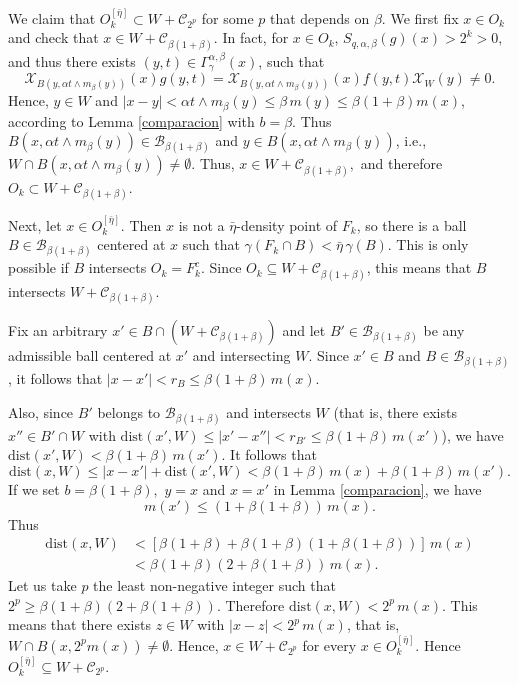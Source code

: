 \documentclass[leqno,11pt]{amsart}
\theoremstyle{plain}
\theoremstyle{remark}
\begin{document}
{{{{We claim that $O_k^{[\bar{\eta}]} 
\subset W+\mathscr{C}_{2^p}$ for some $p$ that depends on $\beta.$}
We first fix $x\in O_k$ and check that $x\in W+\mathscr{C}_{\beta (1+\beta)}$. In fact, for $x\in O_k$, $S_{q,\alpha, \beta} (g)(x)>2^k>0,$ and thus there exists $(y,t)\in \Gamma_\gamma^{\alpha, \beta}(x)$, such that
\[\mathcal{X}_{B(y,\alpha t\wedge m_\beta(y))}(x) g(y,t)=\mathcal{X}_{B(y,\alpha t\wedge m_\beta(y))}(x) f(y,t) \mathcal{X}_{W}(y)\neq 0.\]
Hence, $y\in W$ and $|x-y|<\alpha t\wedge m_\beta(y) \leq\beta\,  m(y)\leq \beta (1+\beta) m(x)$, according to Lemma \ref{comparacion} with $b=\beta.$ Thus $B(x,\alpha t\wedge m_\beta(y))\in \mathscr{B}_{\beta (1+\beta)}$ and $y\in B(x,\alpha t\wedge m_\beta(y))$, i.e., $W\cap B(x,\alpha t\wedge m_\beta(y))\neq \emptyset$. Thus, $x\in W+\mathscr{C}_{\beta (1+\beta)},$  and therefore $O_k\subset   W+\mathscr{C}_{\beta (1+\beta)}$.

Next, let $x\in O_k^{[\bar{\eta}]}$. Then $x$ is not a $\bar{\eta}$-density point of $F_k$, so there is a ball $B\in \mathscr{B}_{\beta(1+\beta)}$ centered at $x$ such that $\gamma(F_k\cap B)<\bar{\eta}\,  \gamma(B)$. This is only possible if $B$ intersects $O_k=F_k^c$. Since $O_k\subseteq W+\mathscr{C}_{\beta(1+\beta)}$, this means that $B$ intersects $W+\mathscr{C}_{\beta (1+\beta)}$.

Fix an arbitrary $x'\in B\cap (W+\mathscr{C}_{\beta(1+\beta)})$ and let $B'\in \mathscr{B}_{\beta(1+\beta)}$ be any admissible ball centered at $x'$ and intersecting $W$. Since $x'\in B$ and $B\in \mathscr{B}_{\beta(1+\beta)}$, it follows that $|x-x'|<r_B\le \beta (1+\beta)\, m(x).$ 

Also, since $B'$ belongs to $\mathscr{B}_{\beta (1+\beta)}$ and intersects $W$ (that is, there exists $x''\in B'\cap W$ with $\text{dist}(x',W)\leq |x'-x''|<r_{B'}\leq \beta (1+\beta)\, m(x')$), we have $\text{dist}(x',W)<\beta (1+\beta)\, m(x')$. It follows that 
\[\text{dist}(x,W)\leq |x-x'|+\text{dist}(x',W)<\beta(1+\beta)\, m(x)+\beta (1+\beta)\, m(x').\]
If we set $b=\beta(1+\beta),$ $y=x$ and $x=x'$ in Lemma \ref{comparacion}, we have $$m(x')\le (1+\beta (1+\beta))\, m(x).$$ Thus
\begin{align*}\text{dist}(x,W)&<[\beta(1+\beta)+\beta (1+\beta)(1+\beta (1+\beta))]\, m(x)\\ &<\beta (1+\beta) (2+\beta(1+\beta))\, m(x).
\end{align*}
Let us take $p$ the least non-negative integer such that $2^p\ge \beta (1+\beta)(2+\beta(1+\beta)).$ Therefore $\text{dist}(x,W)<2^p\, m(x).$
This means that there exists $z\in W$ with $|x-z|<2^p\, m(x)$, that is, $W\cap B(x,2^p m(x))\neq \emptyset$. Hence, $x\in W+\mathscr{C}_{2^p}$ for every $x\in O_k^{[\bar{\eta}]}.$ Hence $O_k^{[\bar{\eta}]}\subseteq W+\mathscr{C}_{2^p}$.

}}}
\end{document}
